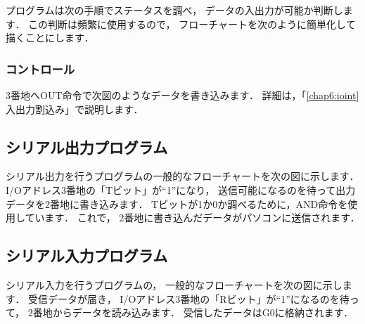 \begin{center}
\end{center}

プログラムは次の手順でステータスを調べ，
データの入出力が可能か判断します．
この判断は頻繁に使用するので，
フローチャートを次のように簡単化して描くことにします．

\begin{center}
\end{center}

\subsubsection{コントロール}
3番地へOUT命令で次図のようなデータを書き込みます．
詳細は，「\ref{chap6:ioint} 入出力割込み」で説明します．

\begin{center}
\end{center}

\newpage
\subsection{シリアル出力プログラム}
シリアル出力を行うプログラムの一般的なフローチャートを次の図に示します．
I/Oアドレス3番地の「Tビット」が``1''になり，
送信可能になるのを待って出力データを2番地に書き込みます．
Tビットが1か0か調べるために，AND命令を使用しています．
これで，%
2番地に書き込んだデータがパソコンに送信されます．

\begin{center}
\end{center}

\subsection{シリアル入力プログラム}
シリアル入力を行うプログラムの，
一般的なフローチャートを次の図に示します．
受信データが届き，
I/Oアドレス3番地の「Rビット」が``1''になるのを待って，
2番地からデータを読み込みます．
受信したデータはG0に格納されます．

\begin{center}
\end{center}

